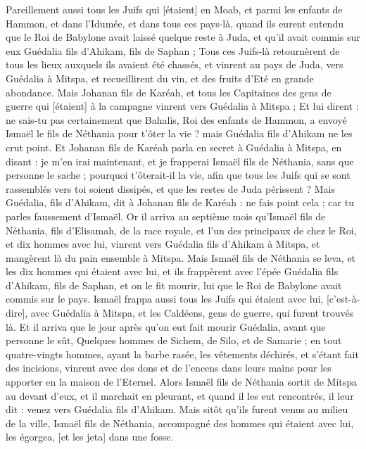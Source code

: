 \begin{multicols}{2}
Pareillement aussi tous les Juifs qui [étaient] en Moab, et parmi les enfants de Hammon, et dans l'Idumée, et dans tous ces pays-là, quand ils eurent entendu que le Roi de Babylone avait laissé quelque reste à Juda, et qu'il avait commis sur eux Guédalia fils d'Ahikam, fils de Saphan ;
Tous ces Juifs-là retournèrent de tous les lieux auxquels ils avaient été chassés, et vinrent au pays de Juda, vers Guédalia à Mitspa, et recueillirent du vin, et des fruits d'Eté en grande abondance.
Mais Johanan fils de Karéah, et tous les Capitaines des gens de guerre qui [étaient] à la campagne vinrent vers Guédalia à Mitspa ;
Et lui dirent : ne sais-tu pas certainement que Bahalis, Roi des enfants de Hammon, a envoyé Ismaël le fils de Néthania pour t'ôter la vie ? mais Guédalia fils d'Ahikam ne les crut point.
Et Johanan fils de Karéah parla en secret à Guédalia à Mitspa, en disant : je m'en irai maintenant, et je frapperai Ismaël fils de Néthania, sans que personne le sache ; pourquoi t'ôterait-il la vie, afin que tous les Juifs qui se sont rassemblés vers toi soient dissipés, et que les restes de Juda périssent ?
Mais Guédalia, fils d'Ahikam, dit à Johanan fils de Karéah : ne fais point cela ; car tu parles faussement d'Ismaël.
\VerseOne{}Or il arriva au septième mois qu'Ismaël fils de Néthania, fils d'Elisamah, de la race royale, et l'un des principaux de chez le Roi, et dix hommes avec lui, vinrent vers Guédalia fils d'Ahikam à Mitspa, et mangèrent là du pain ensemble à Mitspa.
Mais Ismaël fils de Néthania se leva, et les dix hommes qui étaient avec lui, et ils frappèrent avec l'épée Guédalia fils d'Ahikam, fils de Saphan, et on le fit mourir, lui que le Roi de Babylone avait commis sur le pays.
Ismaël frappa aussi tous les Juifs qui étaient avec lui, [c'est-à-dire], avec Guédalia à Mitspa, et les Caldéens, gens de guerre, qui furent trouvés là.
Et il arriva que le jour après qu'on eut fait mourir Guédalia, avant que personne le sût,
Quelques hommes de Sichem, de Silo, et de Samarie ; en tout quatre-vingts hommes, ayant la barbe rasée, les vêtements déchirés, et s'étant fait des incisions, vinrent avec des dons et de l'encens dans leurs mains pour les apporter en la maison de l'Eternel.
Alors Ismaël fils de Néthania sortit de Mitspa au devant d'eux, et il marchait en pleurant, et quand il les eut rencontrés, il leur dit : venez vers Guédalia fils d'Ahikam.
Mais sitôt qu'ils furent venus au milieu de la ville, Ismaël fils de Néthania, accompagné des hommes qui étaient avec lui, les égorgea, [et les jeta] dans une fosse.

\end{multicols}
